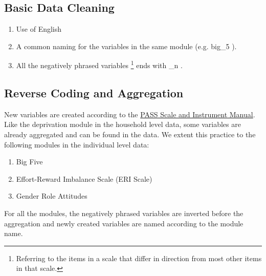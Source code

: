 \documentclass[11pt, a4paper, leqno]{article}
\begin{document}
\subsection{Basic Data Cleaning}
\begin{enumerate}
\item Use of English
\item A common naming for the variables in the same module (e.g.  big\_5 ).
\item All the negatively phrased variables \footnote{Referring to the items in a scale that differ in direction from most other items in that scale.} ends with  \_n .
\end{enumerate}
\subsection{Reverse Coding and Aggregation}
New variables are created according to the \href{https://doku.iab.de/fdz/reporte/2020/MR_07-20_EN.pdf}{PASS Scale and Instrument Manual}.\\[12pt]
Like the deprivation module in the household level data, some variables are already aggregated and can be found in the data. We extent this practice to the following modules in the individual level data:
\begin{enumerate}
\item Big Five
\item Effort-Reward Imbalance Scale (ERI Scale)
\item Gender Role Attitudes
\end{enumerate}
For all the modules, the negatively phrased variables are inverted before the aggregation and newly created variables are named according to the module name.
\end{document}
